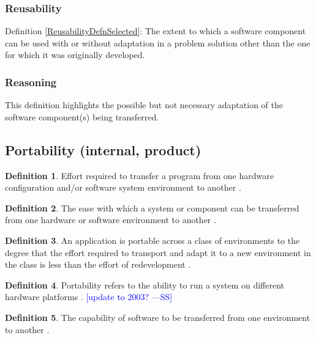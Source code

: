 \documentclass[letterpaper, cleveref]{lipics-v2019}
\newcommand{\authornote}[3]{\textcolor{#1}{[#3 ---#2]}}
\newcommand{\authornote}[3]{}
\newcommand{\wss}[1]{\authornote{blue}{SS}{#1}} %
\newcommand{\pmi}[1]{\authornote{green}{PM}{#1}} %
\theoremstyle{definition}
\newtheorem{defn}{Definition}
\begin{document}
\begin{mybox}
\subsubsection*{Reusability}
Definition \ref{ReusabilityDefnSelected}: The extent to which a software
component can be used with or without adaptation in a problem solution other
than the one for which it was originally developed.
\end{mybox}

\subsubsection*{Reasoning}

This definition highlights the possible but not necessary adaptation of the
software component(s) being transferred.


\subsection{Portability (internal, product)} %

\begin{defn} \label{PortabilityDefnSelected}
  Effort required to transfer a program from one hardware configuration
  and/or software system environment to another \citep{McCallEtAl1977}.
\end{defn}

\begin{defn}
  The ease with which a system or component can be transferred from one
  hardware or software environment to another \citep{IEEEStdGlossarySET1990}.
\end{defn}

\begin{defn}
  An application is portable across a class of environments to the degree
  that the effort required to transport and adapt it to a new environment in
  the class is less than the effort of redevelopment
  \citep{mooney1990strategies}.
\end{defn}

\begin{defn}
  Portability refers to the ability to run a system on different hardware
  platforms \citep{ghezzi1991fundamentals}.  \wss{update to 2003?}
\end{defn}

\begin{defn}
  The capability of software to be transferred from one environment to
  another \cite{ISO9126}. %
\end{defn}
\end{document}
